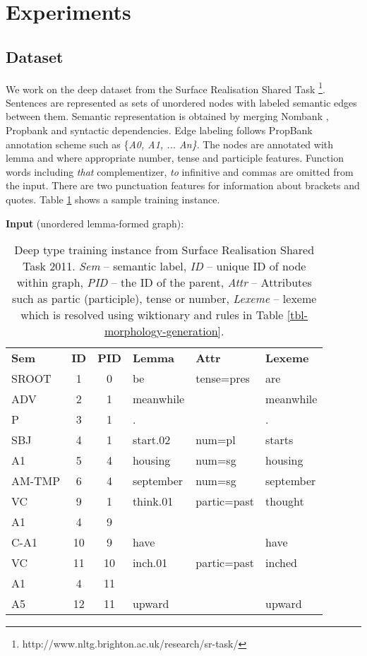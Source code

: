 \documentclass[11pt]{article}
\begin{document}
\section{Experiments}
\subsection{Dataset} 
We work on the deep dataset from the Surface Realisation Shared Task \cite{belz2011first}\footnote{http://www.nltg.brighton.ac.uk/research/sr-task/}. Sentences are represented as sets of unordered nodes with labeled semantic edges between them. Semantic representation is obtained by merging Nombank \cite{L04-1228}, Propbank \cite{J05-1004} and syntactic dependencies. Edge labeling follows PropBank annotation scheme such as \{{\it A0, A1, ... An\}}. The nodes are annotated with lemma and where appropriate number, tense and participle features. Function words including {\it that} complementizer, {\it to} infinitive and commas are omitted from  the input. There are two punctuation features for information about brackets and quotes. Table \ref{training-instance} shows a sample training instance. 

\begin{table}
\scriptsize
\begin{tablenotes}
\item \textbf{Input} (unordered lemma-formed graph):
\end{tablenotes}
\begin{tabular}{lcclll}
\textbf{Sem} & \textbf{ID} & \textbf{PID} & \textbf{Lemma} & \textbf{Attr} & \textbf{Lexeme}\\
SROOT &	1 & 0 &	be &	tense=pres	&	are\\
ADV	&	2	&	1	&	meanwhile	&	& meanwhile\\
P	&	3	&	1	&	.	&	& .\\
SBJ	&	4	&	1	&	start.02	&	num=pl	& starts\\
A1	&	5	&	4	&	housing	&	num=sg	& housing\\
AM-TMP	&	6	&	4	&	september	&	num=sg	& september\\
VC	&	9	&	1	&	think.01	&	partic=past	& thought\\
A1	&	 4	&	9& & &\\
C-A1	&	10	&	9	&	have	&&have\\
VC	&	11	&	10	&	inch.01	&	partic=past &inched\\
A1	&	 4	&	11 & & &\\
A5	&	12	&	11	&	upward&&upward\\
\end{tabular} 
\caption{Deep type training instance from Surface Realisation Shared Task 2011. {\it Sem} -- semantic label, {\it ID} -- unique ID of node within graph, {\it PID} -- the ID of the parent, {\it Attr} -- Attributes such as partic (participle), tense or number, {\it Lexeme} -- lexeme which is resolved using wiktionary and rules in Table \ref{tbl-morphology-generation}.}
\label{training-instance}
\vspace*{-1.5em}
\end{table}
\end{document}
